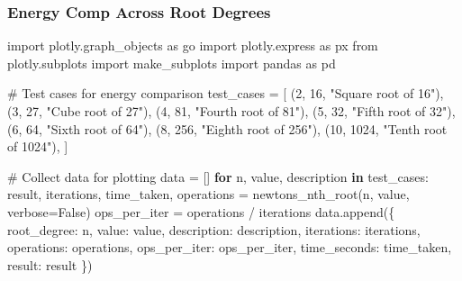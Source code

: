 \documentclass[
  letterpaper,
  DIV=11,
  numbers=noendperiod]{scrartcl}
\newenvironment{Shaded}{\begin{snugshade}}{\end{snugshade}}
\newcommand{\CommentTok}[1]{\textcolor[rgb]{0.37,0.37,0.37}{#1}}
\newcommand{\ControlFlowTok}[1]{\textcolor[rgb]{0.00,0.23,0.31}{\textbf{#1}}}
\newcommand{\DecValTok}[1]{\textcolor[rgb]{0.68,0.00,0.00}{#1}}
\newcommand{\ImportTok}[1]{\textcolor[rgb]{0.00,0.46,0.62}{#1}}
\newcommand{\KeywordTok}[1]{\textcolor[rgb]{0.00,0.23,0.31}{\textbf{#1}}}
\newcommand{\NormalTok}[1]{\textcolor[rgb]{0.00,0.23,0.31}{#1}}
\newcommand{\OperatorTok}[1]{\textcolor[rgb]{0.37,0.37,0.37}{#1}}
\newcommand{\StringTok}[1]{\textcolor[rgb]{0.13,0.47,0.30}{#1}}
\newcommand{\VariableTok}[1]{\textcolor[rgb]{0.07,0.07,0.07}{#1}}
\begin{document}
\subsubsection{Energy Comp Across Root
Degrees}\label{energy-comp-across-root-degrees}

\begin{Shaded}
\begin{Highlighting}[]
\ImportTok{import}\NormalTok{ plotly.graph\_objects }\ImportTok{as}\NormalTok{ go}
\ImportTok{import}\NormalTok{ plotly.express }\ImportTok{as}\NormalTok{ px}
\ImportTok{from}\NormalTok{ plotly.subplots }\ImportTok{import}\NormalTok{ make\_subplots}
\ImportTok{import}\NormalTok{ pandas }\ImportTok{as}\NormalTok{ pd}

\CommentTok{\# Test cases for energy comparison}
\NormalTok{test\_cases }\OperatorTok{=}\NormalTok{ [}
\NormalTok{    (}\DecValTok{2}\NormalTok{, }\DecValTok{16}\NormalTok{, }\StringTok{"Square root of 16"}\NormalTok{), (}\DecValTok{3}\NormalTok{, }\DecValTok{27}\NormalTok{, }\StringTok{"Cube root of 27"}\NormalTok{),}
\NormalTok{    (}\DecValTok{4}\NormalTok{, }\DecValTok{81}\NormalTok{, }\StringTok{"Fourth root of 81"}\NormalTok{), (}\DecValTok{5}\NormalTok{, }\DecValTok{32}\NormalTok{, }\StringTok{"Fifth root of 32"}\NormalTok{),}
\NormalTok{    (}\DecValTok{6}\NormalTok{, }\DecValTok{64}\NormalTok{, }\StringTok{"Sixth root of 64"}\NormalTok{), (}\DecValTok{8}\NormalTok{, }\DecValTok{256}\NormalTok{, }\StringTok{"Eighth root of 256"}\NormalTok{),}
\NormalTok{    (}\DecValTok{10}\NormalTok{, }\DecValTok{1024}\NormalTok{, }\StringTok{"Tenth root of 1024"}\NormalTok{),}
\NormalTok{]}

\CommentTok{\# Collect data for plotting}
\NormalTok{data }\OperatorTok{=}\NormalTok{ []}
\ControlFlowTok{for}\NormalTok{ n, value, description }\KeywordTok{in}\NormalTok{ test\_cases:}
\NormalTok{    result, iterations, time\_taken, operations }\OperatorTok{=}\NormalTok{ newtons\_nth\_root(n, value, verbose}\OperatorTok{=}\VariableTok{False}\NormalTok{)}
\NormalTok{    ops\_per\_iter }\OperatorTok{=}\NormalTok{ operations }\OperatorTok{/}\NormalTok{ iterations}
\NormalTok{    data.append(\{}
        \StringTok{\textquotesingle{}root\_degree\textquotesingle{}}\NormalTok{: n,}
        \StringTok{\textquotesingle{}value\textquotesingle{}}\NormalTok{: value,}
        \StringTok{\textquotesingle{}description\textquotesingle{}}\NormalTok{: description,}
        \StringTok{\textquotesingle{}iterations\textquotesingle{}}\NormalTok{: iterations,}
        \StringTok{\textquotesingle{}operations\textquotesingle{}}\NormalTok{: operations,}
        \StringTok{\textquotesingle{}ops\_per\_iter\textquotesingle{}}\NormalTok{: ops\_per\_iter,}
        \StringTok{\textquotesingle{}time\_seconds\textquotesingle{}}\NormalTok{: time\_taken,}
        \StringTok{\textquotesingle{}result\textquotesingle{}}\NormalTok{: result}
\NormalTok{    \})}


\end{Highlighting}
\end{Shaded}
\end{document}
